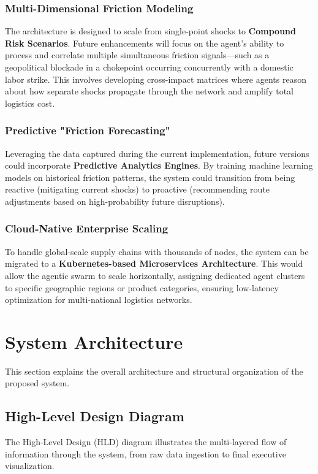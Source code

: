 \subsubsection{Multi-Dimensional Friction Modeling}
The architecture is designed to scale from single-point shocks to \textbf{Compound Risk Scenarios}. Future enhancements will focus on the agent's ability to process and correlate multiple simultaneous friction signals—such as a geopolitical blockade in a chokepoint occurring concurrently with a domestic labor strike. This involves developing cross-impact matrices where agents reason about how separate shocks propagate through the network and amplify total logistics cost.

\subsubsection{Predictive "Friction Forecasting"}
Leveraging the data captured during the current implementation, future versions could incorporate \textbf{Predictive Analytics Engines}. By training machine learning models on historical friction patterns, the system could transition from being reactive (mitigating current shocks) to proactive (recommending route adjustments based on high-probability future disruptions).

\subsubsection{Cloud-Native Enterprise Scaling}
To handle global-scale supply chains with thousands of nodes, the system can be migrated to a \textbf{Kubernetes-based Microservices Architecture}. This would allow the agentic swarm to scale horizontally, assigning dedicated agent clusters to specific geographic regions or product categories, ensuring low-latency optimization for multi-national logistics networks.

\section[System Architecture]{System Architecture}
This section explains the overall architecture and structural organization of the proposed
system.

\subsection[High-Level Design Diagram]{High-Level Design Diagram}
The High-Level Design (HLD) diagram illustrates the multi-layered flow of information through the system, from raw data ingestion to final executive visualization.

